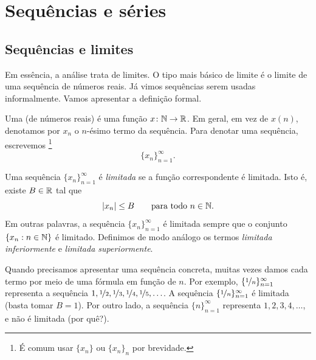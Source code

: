 \chapter{Sequ\^encias e s\'eries} \label{seq:chapter}


\section{Sequ\^encias e limites}
\label{sec:seqsandlims}



Em essência, a análise trata de limites. O tipo mais básico de limite é o
limite de uma sequência de números reais.
Já vimos sequências serem usadas informalmente. Vamos apresentar a definição
formal.

\begin{defn}
Uma \emph{} (de números reais) é uma função
$x \colon {\mathbb{N}} \to {\mathbb{R}}$. Em geral, em vez de $x(n)$, denotamos por $x_n$ o
$n$-ésimo termo da sequência.
Para denotar uma sequência, escrevemos%
\footnote{É comum usar $\{ x_n \}$ ou $\{ x_n \}_n$ por brevidade.}%
%
\begin{equation*}
\{ x_n \}_{n=1}^\infty.
\end{equation*}

Uma sequência $\{ x_n \}_{n=1}^\infty$ é \emph{limitada} se
a função correspondente é limitada. Isto é, existe $B \in {\mathbb{R}}$ tal que
\begin{equation*}
\lvert {x_n} \rvert \leq B \qquad \text{para todo } n \in {\mathbb{N}}.
\end{equation*}
Em outras palavras, a sequência $\{x_n\}_{n=1}^\infty$ é limitada sempre
que o conjunto $\{ x_n : n \in {\mathbb{N}} \}$ é limitado.
Definimos de modo análogo os termos
\emph{limitada inferiormente} e
\emph{limitada superiormente}.
\end{defn}

Quando precisamos apresentar uma sequência concreta, muitas vezes damos
cada termo por meio de uma fórmula em função de $n$.
Por exemplo, $\{ \nicefrac{1}{n} \}_{n=1}^\infty$ representa a sequência
$1, \nicefrac{1}{2}, \nicefrac{1}{3}, \nicefrac{1}{4},
\nicefrac{1}{5}, \ldots$.
A sequência $\{ \nicefrac{1}{n} \}_{n=1}^\infty$ é limitada (basta tomar
$B=1$). Por outro lado, a sequência $\{ n \}_{n=1}^\infty$ representa
$1,2,3,4,\ldots$, e não é limitada (por quê?).

